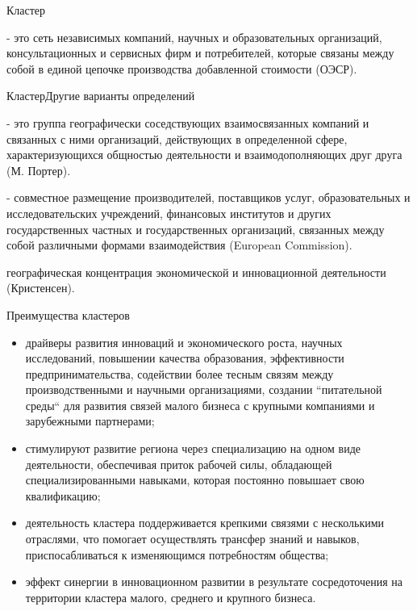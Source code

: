 \documentclass[_Venture_p3.tex]{subfiles}
\begin{document}
\begin{frame}{Кластер}
\begin{block}{}
	\quad
	- это сеть независимых компаний, научных и образовательных организаций, консультационных и сервисных фирм и потребителей, которые связаны между собой в единой цепочке производства добавленной стоимости (ОЭСР).
\end{block}
\end{frame}


\begin{frame}[allowframebreaks]{Кластер}{Другие варианты определений}
\begin{block}{}
	\quad
	- это группа географически соседствующих взаимосвязанных компаний и связанных с ними организаций, действующих в определенной сфере, характеризующихся общностью деятельности и взаимодополняющих друг друга (М. Портер).
\end{block}

\pagebreak


\begin{block}{}
	\quad
	- совместное размещение производителей, поставщиков услуг, образовательных и исследовательских учреждений, финансовых институтов и других государственных частных и государственных организаций, связанных между собой различными формами взаимодействия (European Commission).
\end{block}


\pagebreak


\begin{block}{}
	\quad
	географическая концентрация экономической и инновационной деятельности (Кристенсен).
\end{block}

\end{frame}



\begin{frame}[allowframebreaks]{Преимущества кластеров}{}
\begin{itemize}
	\item драйверы развития инноваций и экономического роста, научных исследований, повышении качества образования, эффективности предпринимательства, содействии более тесным связям между производственными и научными организациями, создании ``питательной среды`` для развития связей малого бизнеса с крупными компаниями и зарубежными партнерами;
	
	\pagebreak
	\item стимулируют развитие региона через специализацию на одном виде деятельности, обеспечивая приток рабочей силы, обладающей специализированными навыками, которая постоянно повышает свою квалификацию;
	\item деятельность кластера поддерживается крепкими связями с несколькими отраслями, что помогает осуществлять трансфер знаний и навыков, приспосабливаться к изменяющимся потребностям общества;

	\pagebreak
	\item эффект синергии в инновационном развитии в результате сосредоточения на территории кластера малого, среднего и крупного бизнеса.
\end{itemize}
\end{frame}
\end{document}
